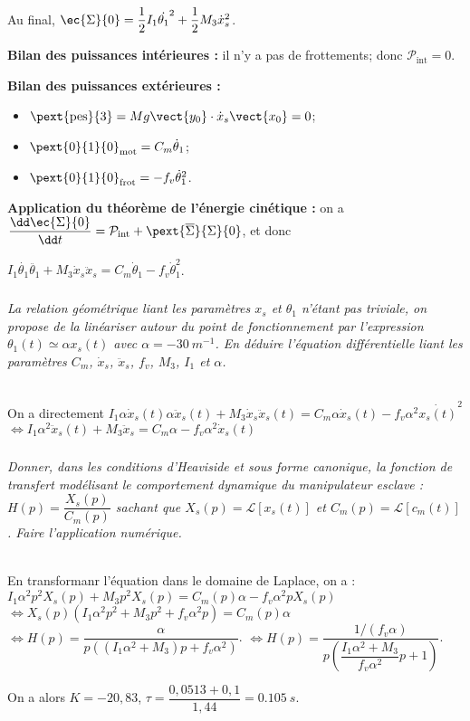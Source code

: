 \begin{multicols}{2}
\begin{corrige}
Au final, $\ec{\Sigma}{0}=\dfrac{1}{2}I_1\dot{\theta_1}^2 + \dfrac{1}{2}M_3\dot{x}_s ^2$.

\textbf{Bilan des puissances intérieures :} il n'y a pas de frottements; donc  $\mathcal{P}_{\text{int}}=0$.

\textbf{Bilan des puissances extérieures :}
\begin{itemize}
\item $\pext{\text{pes}}{3}=Mg\vect{y_0}\cdot \dot{x}_s \vect{x_0} = 0$;
\item $\pext{0}{1}{0}_{\text{mot}}=C_m\dot{\theta}_1$;
\item $\pext{0}{1}{0}_{\text{frot}}=-f_v\dot{\theta}_1^2$.
\end{itemize}

\textbf{Application du théorème de l'énergie cinétique :} on a $\dfrac{\dd \ec{\Sigma}{0} }{\dd t}=\mathcal{P}_{\text{int}} + \pext{\overline{\Sigma}}{\Sigma}{0}$, et donc 

$ I_1\dot{\theta_1}\ddot{\theta_1} + M_3\dot{x}_s\ddot{x}_s =C_m\dot{\theta}_1 -f_v\dot{\theta}_1^2$.


\end{corrige}
\else
\fi


\subparagraph{}\textit{La relation géométrique liant les paramètres $x_s$ et $\theta_1$ n’étant pas triviale, on propose de la
linéariser autour du point de fonctionnement par l’expression $\theta_1(t)\simeq \alpha x_s(t)$ avec $\alpha=-\SI{30}{m^{-1}}$. En déduire l’équation différentielle liant les paramètres $C_m$, $\dot{x}_s$, $\ddot{x}_s$, $f_v$, $M_3$, $I_1$ et $\alpha$.}
\ifprof
\begin{corrige}~\\
On a directement $ I_1\alpha \dot{x}_s(t)\alpha \ddot{x}_s(t) + M_3\dot{x}_s\ddot{x}_s(t) =C_m\alpha \dot{x}_s(t) -f_v\alpha^2\dot{ x_s(t)}^2$
$\Leftrightarrow 
 I_1\alpha^2 \ddot{x}_s(t) + M_3\ddot{x}_s =C_m\alpha  -f_v\alpha^2 \dot{x}_s(t)$
\end{corrige}
\else
\fi


\subparagraph{}\textit{Donner, dans les conditions d’Heaviside et sous forme canonique, la fonction de transfert
modélisant le comportement dynamique du manipulateur esclave : $H(p) = \dfrac{X_s(p)}{C_m(p)}$ sachant que
$X_s(p) = \mathcal{L}\left[x_s(t)\right]$ et $C_m(p) = \mathcal{L}\left[c_m(t)\right]$. Faire l’application numérique.}
\ifprof
\begin{corrige}~\\
En transformanr l'équation dans le domaine de Laplace, on a : $I_1\alpha^2 p^2X_s(p) + M_3p^2X_s(p) =C_m(p)\alpha  -f_v\alpha^2 pX_s(p)$
$\Leftrightarrow X_s(p) \left(I_1\alpha^2 p^2+ M_3p^2+f_v\alpha^2 p\right) =C_m(p)\alpha  $
$\Leftrightarrow H(p) = \dfrac{\alpha}{p\left(\left(I_1\alpha^2+ M_3\right)p+f_v\alpha^2 \right)} $.
$\Leftrightarrow H(p) = \dfrac{1/\left(f_v\alpha\right)}{p\left(\dfrac{I_1\alpha^2+ M_3}{f_v\alpha^2}p+1 \right)} $.

On a alors $K=-20,83$, $\tau = \dfrac{0,0513+ 0,1}{1,44}=\SI{0,105}{s}$.
\end{corrige}
\else
\fi


\end{multicols}
